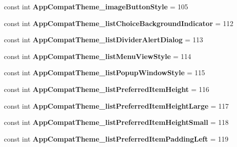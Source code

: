\begin{DoxyCompactItemize}
const int {\bfseries App\+Compat\+Theme\+\_\+image\+Button\+Style} = 105
\item 
\mbox{\label{classst_delivery_1_1_resource_1_1_styleable_ac2cc4fd8ca319922120b40f9b5b1cfbb}} 
const int {\bfseries App\+Compat\+Theme\+\_\+list\+Choice\+Background\+Indicator} = 112
\item 
\mbox{\label{classst_delivery_1_1_resource_1_1_styleable_a6c9d08734e2ba53029bd8744a6849573}} 
const int {\bfseries App\+Compat\+Theme\+\_\+list\+Divider\+Alert\+Dialog} = 113
\item 
\mbox{\label{classst_delivery_1_1_resource_1_1_styleable_a8e46c62a4bd1146a6d5316557928fe2f}} 
const int {\bfseries App\+Compat\+Theme\+\_\+list\+Menu\+View\+Style} = 114
\item 
\mbox{\label{classst_delivery_1_1_resource_1_1_styleable_a980019420cc782e0dabadb386f1d2b28}} 
const int {\bfseries App\+Compat\+Theme\+\_\+list\+Popup\+Window\+Style} = 115
\item 
\mbox{\label{classst_delivery_1_1_resource_1_1_styleable_a18773c68bdced0c4d63917a7a85e28ed}} 
const int {\bfseries App\+Compat\+Theme\+\_\+list\+Preferred\+Item\+Height} = 116
\item 
\mbox{\label{classst_delivery_1_1_resource_1_1_styleable_a3c27703657d90120f5ae1e33ed441d6d}} 
const int {\bfseries App\+Compat\+Theme\+\_\+list\+Preferred\+Item\+Height\+Large} = 117
\item 
\mbox{\label{classst_delivery_1_1_resource_1_1_styleable_a34402cafe0b24ad9d037a1a52dfd401a}} 
const int {\bfseries App\+Compat\+Theme\+\_\+list\+Preferred\+Item\+Height\+Small} = 118
\item 
\mbox{\label{classst_delivery_1_1_resource_1_1_styleable_a59848c4da1bf190e23ac9b57b254d61f}} 
const int {\bfseries App\+Compat\+Theme\+\_\+list\+Preferred\+Item\+Padding\+Left} = 119

\end{DoxyCompactItemize}
